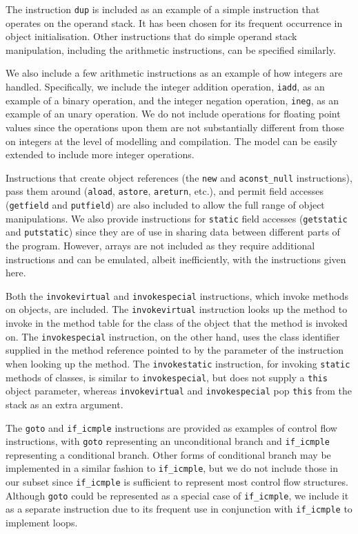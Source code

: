 The instruction \texttt{dup} is included as an example of a simple
instruction that operates on the operand stack.
It has been chosen for its frequent occurrence in object initialisation.
Other instructions that do simple operand stack manipulation,
including the arithmetic instructions, can be specified similarly.

We also include a few arithmetic instructions as an example of how
integers are handled.
Specifically, we include the integer addition operation,
\texttt{iadd}, as an example of a binary operation, and the integer
negation operation, \texttt{ineg}, as an example of an unary
operation.
We do not include operations for floating point values since the
operations upon them are not substantially different from those on
integers at the level of modelling and compilation.
The model can be easily extended to include more integer operations.

Instructions that create object references (the \texttt{new} and
\texttt{aconst\_null} instructions), pass them around (\texttt{aload},
\texttt{astore}, \texttt{areturn}, etc.), and permit
field accesses (\texttt{getfield} and \texttt{putfield}) are also
included to allow the full range of object manipulations.
We also provide instructions for \texttt{static} field accesses
(\texttt{getstatic} and \texttt{putstatic}) since they are of use in
sharing data between different parts of the program.
However, arrays are not included as they require additional
instructions and can be emulated, albeit inefficiently, with the
instructions given here.

Both the \texttt{invokevirtual} and \texttt{invokespecial}
instructions, which invoke methods on objects, are included.
The \texttt{invokevirtual} instruction looks up the method to invoke
in the method table for the class of the object that the method is
invoked on.
The \texttt{invokespecial} instruction, on the other hand, uses the
class identifier supplied in the method reference pointed to by the
parameter of the instruction when looking up the method.
The \texttt{invokestatic} instruction, for invoking \texttt{static}
methods of classes, is similar to \texttt{invokespecial}, but does not
supply a \texttt{this} object parameter, whereas
\texttt{invokevirtual} and \texttt{invokespecial} pop \texttt{this}
from the stack as an extra argument.

The \texttt{goto} and \texttt{if\_icmple} instructions are provided as
examples of control flow instructions, with \texttt{goto} representing
an unconditional branch and \texttt{if\_icmple} representing a
conditional branch.
Other forms of conditional branch may be implemented in a similar
fashion to \texttt{if\_icmple}, but we do not include those in our
subset since \texttt{if\_icmple} is sufficient to represent most
control flow structures.
Although \texttt{goto} could be represented as a special case of
\texttt{if\_icmple}, we include it as a separate instruction due to
its frequent use in conjunction with \texttt{if\_icmple} to implement
loops.

